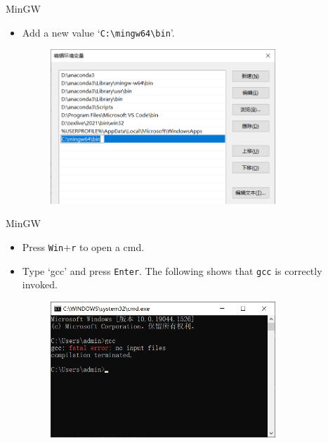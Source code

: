 \documentclass[handout]{beamer}
\begin{document}
\begin{frame}{MinGW}
    \begin{itemize}
        \item Add a new value `\texttt{C:\textbackslash mingw64\textbackslash bin}'.
        \begin{figure}[h]
            \centering
            \includegraphics[width=0.8\textwidth]{figures/added.png}
        \end{figure}
    \end{itemize}
\end{frame}

\begin{frame}{MinGW}
    \begin{itemize}
        \item Press \texttt{Win}\(+\)\texttt{r} to open a cmd.
        \item Type `gcc' and press \texttt{Enter}. The following shows that \texttt{gcc} is correctly invoked.
        \begin{figure}[h]
            \centering
            \includegraphics[width=0.8\textwidth]{figures/cmd_gcc.png}
        \end{figure}
    \end{itemize}
\end{frame}
\end{document}
